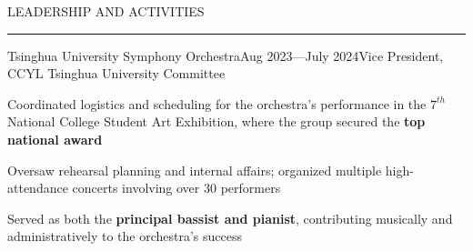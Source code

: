 \documentclass{resume} %
\renewenvironment{rSection}[1]{
\sectionskip
\textcolor{TsinghuaPurple}{\MakeUppercase{#1}}
\sectionlineskip
\hrule
\begin{list}{}{
\setlength{\leftmargin}{0em}
}
\item[]
}{
\end{list}
}
\begin{document}
 
\begin{rSection}{LEADERSHIP AND ACTIVITIES}

    \begin{rSubsection}{Tsinghua University Symphony Orchestra}{Aug 2023---July 2024}{Vice President, CCYL Tsinghua University Committee}{}              
    \item Coordinated logistics and scheduling for the orchestra's performance in the $7^{th}$ National College Student Art Exhibition, where the group secured the \textbf{top national award}
    \item Oversaw rehearsal planning and internal affairs; organized multiple high-attendance concerts involving over 30 performers
    \item Served as both the \textbf{principal bassist and pianist}, contributing musically and administratively to the orchestra’s success
    \end{rSubsection}  
    
    
    \end{rSection}
    


\end{document}
